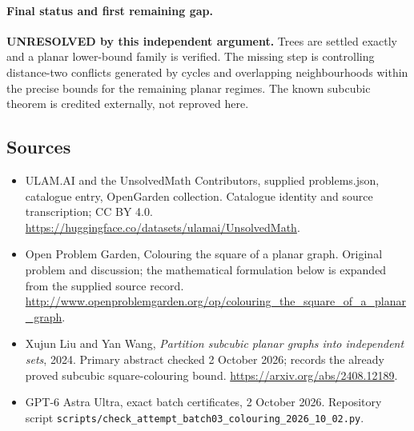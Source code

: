 \documentclass[11pt,a4paper]{article}
\begin{document}
\paragraph{Final status and first remaining gap.}
\textbf{UNRESOLVED by this independent argument.} Trees are settled
exactly and a planar lower-bound family is verified. The missing step
is controlling distance-two conflicts generated by cycles and overlapping
neighbourhoods within the precise bounds for the remaining planar regimes.
The known subcubic theorem is credited externally, not reproved here.

\subsection{Sources}
\begin{itemize}
\item[S1] ULAM.AI and the UnsolvedMath Contributors, supplied problems.json, catalogue entry, OpenGarden collection. Catalogue identity and source transcription; CC BY 4.0.
\url{https://huggingface.co/datasets/ulamai/UnsolvedMath}.
\item[S2] Open Problem Garden, Colouring the square of a planar graph. Original problem and discussion; the mathematical formulation below is expanded from the supplied source record.
\url{http://www.openproblemgarden.org/op/colouring_the_square_of_a_planar_graph}.

\item[R1] Xujun Liu and Yan Wang, \emph{Partition subcubic planar
graphs into independent sets}, 2024. Primary abstract checked 2 October
2026; records the already proved subcubic square-colouring bound.
\url{https://arxiv.org/abs/2408.12189}.
\item[R2] GPT-6 Astra Ultra, exact batch certificates, 2 October 2026.
Repository script \texttt{scripts/check\_attempt\_batch03\_colouring\_2026\_10\_02.py}.

\end{itemize}
\end{document}
